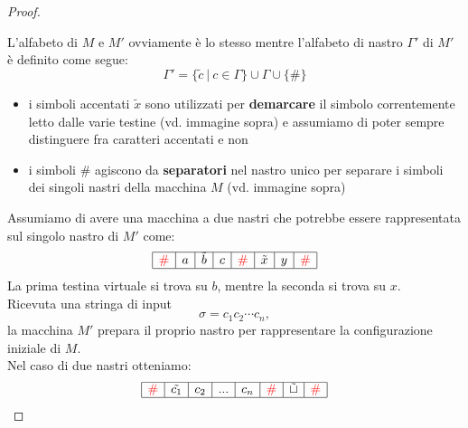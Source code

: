 \begin{proof}
\begin{figure}[htbp]

\end{figure}

\noindent L'alfabeto di $M$ e $M'$ ovviamente è lo stesso mentre l'alfabeto di nastro $\Gamma'$ di $M'$ è definito come segue:
\[  \Gamma' = \{ \tilde{c}\ | \  c \in \Gamma \} \cup \Gamma \cup \{ \#  \}    \]
\begin{itemize}
    \item i simboli accentati $\tilde{x}$ sono utilizzati per \textbf{demarcare} il simbolo correntemente letto dalle varie testine (vd. immagine sopra) e assumiamo di poter sempre distinguere fra caratteri accentati e non
    \item i simboli $\#$ agiscono da \textbf{separatori} nel nastro unico per separare i simboli dei singoli nastri della macchina $M$ (vd. immagine sopra)
\end{itemize}
Assumiamo di avere una macchina a due nastri che potrebbe essere
rappresentata sul singolo nastro di $M'$ come:
\[
  \begin{array}{|c|c|c|c|c|c|c|c|}
    \hline
\mathcolor{red}{\bm{\#}} & a & \tilde{b} & c & \mathcolor{red}{\bm{\#}} & \tilde{x} & y & \mathcolor{red}{\bm{\#}} \\
  \hline
    
\end{array}   
\]
La prima testina virtuale si trova su $b$, mentre la seconda si trova su $x$.\\
Ricevuta una stringa di input
\[
    \sigma=c_1c_2\cdots c_n,
\]
la macchina $M'$ prepara il proprio nastro per rappresentare la configurazione iniziale di $M$.\\
Nel caso di due nastri otteniamo:
\[
  \begin{array}{|c|c|c|c|c|c|c|c|}
    \hline
\mathcolor{red}{\bm{\#}} & \tilde{c_1} & c_2 & ... & c_n  & \mathcolor{red}{\bm{\#}} & \tilde{\sqcup} & \mathcolor{red}{\bm{\#}} \\
  \hline
    

\end{array}\]
\end{proof}
